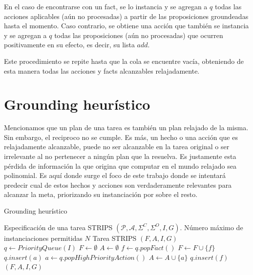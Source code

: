 En el caso de encontrarse con un fact, se lo instancia y se agregan a $q$ todas
las acciones aplicables (aún no procesadas) a partir de las proposiciones
groundeadas hasta el momento. Caso contrario, se obtiene una acción que también
se instancia y se agregan a $q$ todas las proposiciones (aún no procesadas) que
ocurren positivamente en su efecto, es decir, su lista $add$.

Este procedimiento se repite hasta que la cola se encuentre vacía, obteniendo de
esta manera todas las acciones y facts alcanzables relajadamente.

\section{Grounding heurístico}
\label{lit:heuristic_grounding}

Mencionamos que un plan de una tarea es también un plan relajado de la misma.
Sin embargo, el reciproco no se cumple. Es más, un hecho o una acción que es
relajadamente alcanzable, puede no ser alcanzable en la tarea original o ser
irrelevante al no pertenecer a ningún plan que la resuelva. Es justamente esta
pérdida de información la que origina que computar en el mundo relajado sea
polinomial. Es aquí donde surge el foco de este trabajo donde se intentará
predecir cual de estos hechos y acciones son verdaderamente relevantes para
alcanzar la meta, priorizando su instanciación por sobre el resto.

\begin{algorithm}
    \caption{Grounding heurístico}\label{alg:grounding-heuristico}
    \begin{algorithmic}[1]
    \Require Especificación de una tarea STRIPS $(\mathcal{P}, \mathcal{A},
    \Sigma^{C}, \Sigma^{O}, I, G)$. Número máximo de instanciaciones permitidas
    $N$ \Ensure Tarea STRIPS $(F, A, I, G)$ \State $q \gets PriorityQueue(I)$
    \State $F \gets \emptyset$ \State $A \gets \emptyset$     
     \State $f \gets q.popFact()$ \State $F \gets F \cup
        \{f\}$  \State $q.insert(a)$
        \EndFor \Else \State $a \gets q.popHighPriorityAction()$ \State $A \gets
        A \cup \{a\}$  \State $q.insert(f)$
        \EndFor \EndIf \EndWhile \State \Return $(F, A, I, G)$
    \end{algorithmic}
\end{algorithm}

